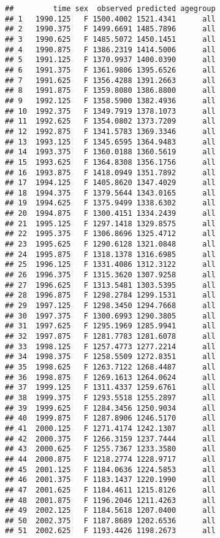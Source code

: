 \documentclass[]{article}
\begin{document}
\begin{verbatim}
##         time sex  observed predicted agegroup
## 1   1990.125   F 1500.4002 1521.4341      all
## 2   1990.375   F 1499.6691 1485.7896      all
## 3   1990.625   F 1485.5072 1450.1451      all
## 4   1990.875   F 1386.2319 1414.5006      all
## 5   1991.125   F 1370.9937 1400.0390      all
## 6   1991.375   F 1361.9806 1395.6526      all
## 7   1991.625   F 1356.4288 1391.2663      all
## 8   1991.875   F 1359.8080 1386.8800      all
## 9   1992.125   F 1358.5900 1382.4936      all
## 10  1992.375   F 1349.7919 1378.1073      all
## 11  1992.625   F 1354.0802 1373.7209      all
## 12  1992.875   F 1341.5783 1369.3346      all
## 13  1993.125   F 1345.6595 1364.9483      all
## 14  1993.375   F 1360.0188 1360.5619      all
## 15  1993.625   F 1364.8308 1356.1756      all
## 16  1993.875   F 1418.0949 1351.7892      all
## 17  1994.125   F 1405.8620 1347.4029      all
## 18  1994.375   F 1379.5644 1343.0165      all
## 19  1994.625   F 1375.9499 1338.6302      all
## 20  1994.875   F 1300.4151 1334.2439      all
## 21  1995.125   F 1297.1418 1329.8575      all
## 22  1995.375   F 1306.8696 1325.4712      all
## 23  1995.625   F 1290.6128 1321.0848      all
## 24  1995.875   F 1318.1378 1316.6985      all
## 25  1996.125   F 1331.4086 1312.3122      all
## 26  1996.375   F 1315.3620 1307.9258      all
## 27  1996.625   F 1313.5481 1303.5395      all
## 28  1996.875   F 1298.2784 1299.1531      all
## 29  1997.125   F 1298.3450 1294.7668      all
## 30  1997.375   F 1300.6993 1290.3805      all
## 31  1997.625   F 1295.1969 1285.9941      all
## 32  1997.875   F 1281.7783 1281.6078      all
## 33  1998.125   F 1257.4773 1277.2214      all
## 34  1998.375   F 1258.5509 1272.8351      all
## 35  1998.625   F 1263.7122 1268.4487      all
## 36  1998.875   F 1269.1613 1264.0624      all
## 37  1999.125   F 1311.4337 1259.6761      all
## 38  1999.375   F 1293.5518 1255.2897      all
## 39  1999.625   F 1284.3456 1250.9034      all
## 40  1999.875   F 1287.8906 1246.5170      all
## 41  2000.125   F 1271.4174 1242.1307      all
## 42  2000.375   F 1266.3159 1237.7444      all
## 43  2000.625   F 1255.7367 1233.3580      all
## 44  2000.875   F 1218.2774 1228.9717      all
## 45  2001.125   F 1184.0636 1224.5853      all
## 46  2001.375   F 1183.1437 1220.1990      all
## 47  2001.625   F 1184.4611 1215.8126      all
## 48  2001.875   F 1196.2046 1211.4263      all
## 49  2002.125   F 1184.5618 1207.0400      all
## 50  2002.375   F 1187.8689 1202.6536      all
## 51  2002.625   F 1193.4426 1198.2673      all

\end{verbatim}
\end{document}
